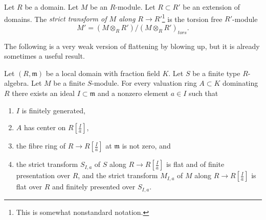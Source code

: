 \begin{definition}
\label{definition-strict-transform}
Let $R$ be a domain. Let $M$ be an $R$-module. Let $R \subset R'$ be an
extension of domains. The {\it strict transform of $M$ along
$R \to R'$}\footnote{This is somewhat nonstandard notation.} is
the torsion free $R'$-module
$$
M' = (M \otimes_R R')/(M \otimes_R R')_{tors}.
$$
\end{definition}

\noindent
The following is a very weak version of flattening by blowing up, but
it is already sometimes a useful result.

\begin{lemma}
\label{lemma-flatten-on-affine-blowup}
Let $(R, \mathfrak m)$ be a local domain with fraction field $K$.
Let $S$ be a finite type $R$-algebra.
Let $M$ be a finite $S$-module.
For every valuation ring $A \subset K$ dominating $R$
there exists an ideal $I \subset \mathfrak m$ and a nonzero
element $a \in I$ such that
\begin{enumerate}
\item $I$ is finitely generated,
\item $A$ has center on $R[\frac{I}{a}]$,
\item the fibre ring of $R \to R[\frac{I}{a}]$ at $\mathfrak m$
is not zero, and
\item the strict transform $S_{I, a}$ of $S$ along $R \to R[\frac{I}{a}]$
is flat and of finite presentation over $R$, and the strict transform
$M_{I, a}$ of $M$ along $R \to R[\frac{I}{a}]$ is flat over $R$ and
finitely presented over $S_{I, a}$.
\end{enumerate}
\end{lemma}

